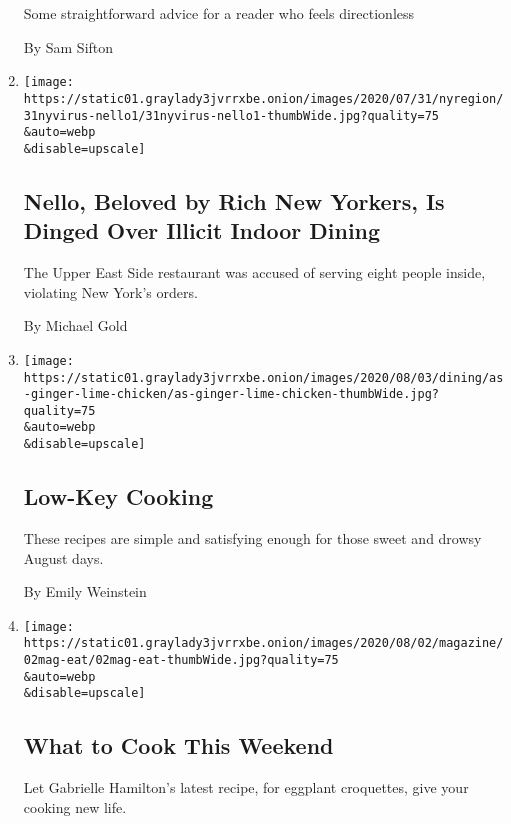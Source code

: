 \begin{enumerate}
  Some straightforward advice for a reader who feels directionless

  By Sam Sifton
\item
  \href{/2020/07/31/nyregion/nello-liquor-license-suspended.html}{}

  \texttt{[image: https://static01.graylady3jvrrxbe.onion/images/2020/07/31/nyregion/31nyvirus-nello1/31nyvirus-nello1-thumbWide.jpg?quality=75\\\&auto=webp\\\&disable=upscale]}

  \hypertarget{nello-beloved-by-rich-new-yorkers-is-dinged-over-illicit-indoor-dining}{%
  \subsection{Nello, Beloved by Rich New Yorkers, Is Dinged Over Illicit
  Indoor
  Dining}\label{nello-beloved-by-rich-new-yorkers-is-dinged-over-illicit-indoor-dining}}

  The Upper East Side restaurant was accused of serving eight people
  inside, violating New York's orders.

  By Michael Gold
\item
  \href{/2020/07/31/dining/low-key-cooking.html}{}

  \texttt{[image: https://static01.graylady3jvrrxbe.onion/images/2020/08/03/dining/as-ginger-lime-chicken/as-ginger-lime-chicken-thumbWide.jpg?quality=75\\\&auto=webp\\\&disable=upscale]}

  \hypertarget{low-key-cooking}{%
  \subsection{Low-Key Cooking}\label{low-key-cooking}}

  These recipes are simple and satisfying enough for those sweet and
  drowsy August days.

  By Emily Weinstein
\item
  \href{/2020/07/31/dining/what-to-cook-this-weekend.html}{}

  \texttt{[image: https://static01.graylady3jvrrxbe.onion/images/2020/08/02/magazine/02mag-eat/02mag-eat-thumbWide.jpg?quality=75\\\&auto=webp\\\&disable=upscale]}

  \hypertarget{what-to-cook-this-weekend}{%
  \subsection{What to Cook This
  Weekend}\label{what-to-cook-this-weekend}}

  Let Gabrielle Hamilton's latest recipe, for eggplant croquettes, give
  your cooking new life.


\end{enumerate}
